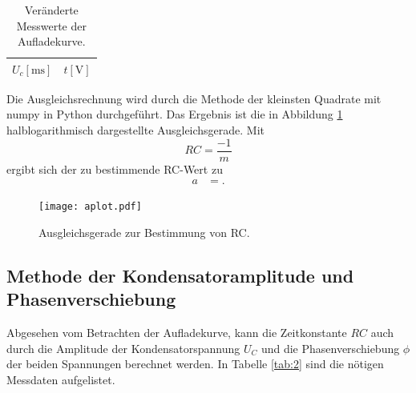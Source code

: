\begin{table}[H]
  \centering
  \caption{Veränderte Messwerte der Aufladekurve.}
  \label{tab:werte_a_neu}
  \begin{tabular}{c c}
    \toprule
    {$U_c [\si{\milli\second}]$} & {$t [\si{\volt}]$}\\
    \midrule
    
    \bottomrule
  \end{tabular}
\end{table}

Die Ausgleichsrechnung wird durch die Methode der kleinsten Quadrate mit numpy in Python durchgeführt.
Das Ergebnis ist die in Abbildung \ref{fig:plot_a} halblogarithmisch dargestellte Ausgleichsgerade.
Mit
\begin{equation}
  RC = \frac{-1}{m}
\end{equation}
ergibt sich der zu bestimmende RC-Wert zu
\begin{align}
  a &= .
\end{align}
\begin{figure}[H]
  \centering
  \texttt{[image: aplot.pdf]}
  \caption{Ausgleichsgerade zur Bestimmung von RC.}
  \label{fig:plot_a}
\end{figure}

\subsection{Methode der Kondensatoramplitude und Phasenverschiebung}
Abgesehen vom Betrachten der Aufladekurve, kann die Zeitkonstante $RC$ auch durch die Amplitude der Kondensatorspannung $U_C$ und die Phasenverschiebung $\phi$ der beiden Spannungen berechnet werden.
In Tabelle \ref{tab:2} sind die nötigen Messdaten aufgelistet.
%
%    
%

